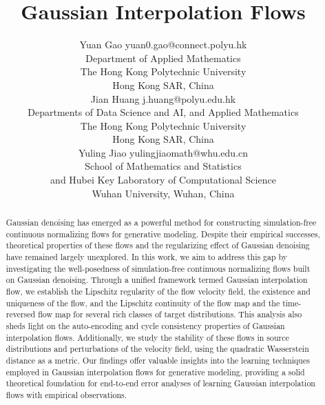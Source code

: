 \documentclass[twoside,11pt]{article}
\numberwithin{equation}{section}
\begin{document}
\title{Gaussian Interpolation Flows}

\author{\name Yuan Gao \email yuan0.gao@connect.polyu.hk \\
        \addr Department of Applied Mathematics \\
        The Hong Kong Polytechnic University \\
        Hong Kong SAR, China \\
        \AND
        \name Jian Huang \email j.huang@polyu.edu.hk \\
        \addr Departments of Data Science and AI, and  Applied Mathematics \\
        The Hong Kong Polytechnic University \\
        Hong Kong SAR, China \\
        \AND
        \name Yuling Jiao \email yulingjiaomath@whu.edu.cn \\
        \addr School of Mathematics and Statistics \\
        and Hubei Key Laboratory of Computational Science \\
        Wuhan University, Wuhan, China
}

\editor{} %

\maketitle

\begin{abstract}%
Gaussian denoising has emerged as a powerful method for constructing simulation-free continuous normalizing flows for generative modeling. Despite their empirical successes, theoretical properties of these flows and the regularizing effect of Gaussian denoising have remained largely unexplored. In this work, we aim to address this gap by investigating the well-posedness of simulation-free continuous normalizing flows built on Gaussian denoising. Through a unified framework termed Gaussian interpolation flow, we establish the Lipschitz regularity of the flow velocity field, the existence and uniqueness of the flow, and the Lipschitz continuity of the flow map and the time-reversed flow map for several rich classes of target distributions. This analysis also sheds light on the auto-encoding and cycle consistency properties of Gaussian interpolation flows. Additionally, we study the stability of these flows in source distributions and perturbations of the velocity field, using the quadratic Wasserstein distance as a metric. Our findings offer valuable insights into the learning techniques employed in Gaussian interpolation flows for generative modeling, providing a solid theoretical foundation for end-to-end error analyses of learning Gaussian interpolation flows with empirical observations.
\end{abstract}
\end{document}
